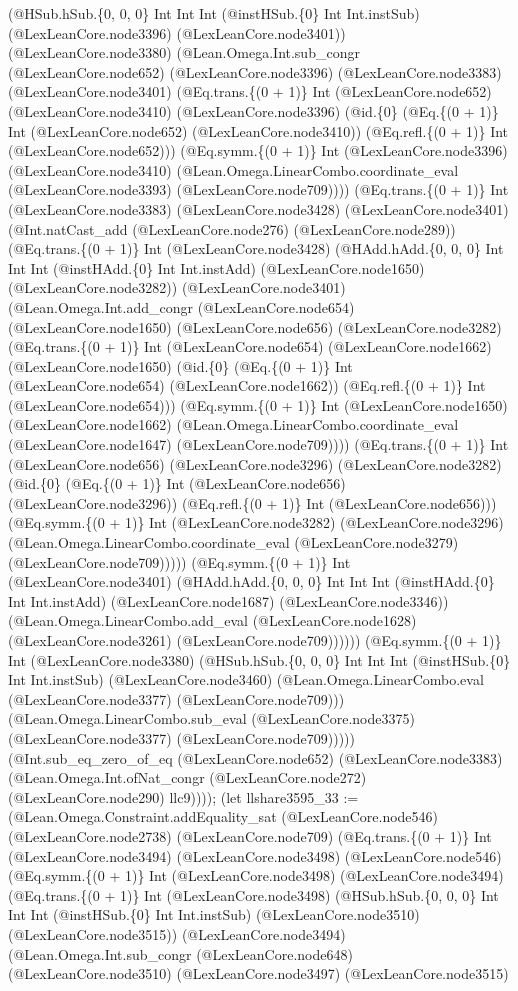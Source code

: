 \documentclass[11pt]{article}
\begin{document}
(@HSub.hSub.\{0, 0, 0\} Int Int Int (@instHSub.\{0\} Int Int.instSub) (@LexLeanCore.node3396) (@LexLeanCore.node3401)) (@LexLeanCore.node3380) (@Lean.Omega.Int.sub\_congr (@LexLeanCore.node652) (@LexLeanCore.node3396) (@LexLeanCore.node3383) (@LexLeanCore.node3401) (@Eq.trans.\{(0 + 1)\} Int (@LexLeanCore.node652) (@LexLeanCore.node3410) (@LexLeanCore.node3396) (@id.\{0\} (@Eq.\{(0 + 1)\} Int (@LexLeanCore.node652) (@LexLeanCore.node3410)) (@Eq.refl.\{(0 + 1)\} Int (@LexLeanCore.node652))) (@Eq.symm.\{(0 + 1)\} Int (@LexLeanCore.node3396) (@LexLeanCore.node3410) (@Lean.Omega.LinearCombo.coordinate\_eval (@LexLeanCore.node3393) (@LexLeanCore.node709)))) (@Eq.trans.\{(0 + 1)\} Int (@LexLeanCore.node3383) (@LexLeanCore.node3428) (@LexLeanCore.node3401) (@Int.natCast\_add (@LexLeanCore.node276) (@LexLeanCore.node289)) (@Eq.trans.\{(0 + 1)\} Int (@LexLeanCore.node3428) (@HAdd.hAdd.\{0, 0, 0\} Int Int Int (@instHAdd.\{0\} Int Int.instAdd) (@LexLeanCore.node1650) (@LexLeanCore.node3282)) (@LexLeanCore.node3401) (@Lean.Omega.Int.add\_congr (@LexLeanCore.node654) (@LexLeanCore.node1650) (@LexLeanCore.node656) (@LexLeanCore.node3282) (@Eq.trans.\{(0 + 1)\} Int (@LexLeanCore.node654) (@LexLeanCore.node1662) (@LexLeanCore.node1650) (@id.\{0\} (@Eq.\{(0 + 1)\} Int (@LexLeanCore.node654) (@LexLeanCore.node1662)) (@Eq.refl.\{(0 + 1)\} Int (@LexLeanCore.node654))) (@Eq.symm.\{(0 + 1)\} Int (@LexLeanCore.node1650) (@LexLeanCore.node1662) (@Lean.Omega.LinearCombo.coordinate\_eval (@LexLeanCore.node1647) (@LexLeanCore.node709)))) (@Eq.trans.\{(0 + 1)\} Int (@LexLeanCore.node656) (@LexLeanCore.node3296) (@LexLeanCore.node3282) (@id.\{0\} (@Eq.\{(0 + 1)\} Int (@LexLeanCore.node656) (@LexLeanCore.node3296)) (@Eq.refl.\{(0 + 1)\} Int (@LexLeanCore.node656))) (@Eq.symm.\{(0 + 1)\} Int (@LexLeanCore.node3282) (@LexLeanCore.node3296) (@Lean.Omega.LinearCombo.coordinate\_eval (@LexLeanCore.node3279) (@LexLeanCore.node709))))) (@Eq.symm.\{(0 + 1)\} Int (@LexLeanCore.node3401) (@HAdd.hAdd.\{0, 0, 0\} Int Int Int (@instHAdd.\{0\} Int Int.instAdd) (@LexLeanCore.node1687) (@LexLeanCore.node3346)) (@Lean.Omega.LinearCombo.add\_eval (@LexLeanCore.node1628) (@LexLeanCore.node3261) (@LexLeanCore.node709)))))) (@Eq.symm.\{(0 + 1)\} Int (@LexLeanCore.node3380) (@HSub.hSub.\{0, 0, 0\} Int Int Int (@instHSub.\{0\} Int Int.instSub) (@LexLeanCore.node3460) (@Lean.Omega.LinearCombo.eval (@LexLeanCore.node3377) (@LexLeanCore.node709))) (@Lean.Omega.LinearCombo.sub\_eval (@LexLeanCore.node3375) (@LexLeanCore.node3377) (@LexLeanCore.node709))))) (@Int.sub\_eq\_zero\_of\_eq (@LexLeanCore.node652) (@LexLeanCore.node3383) (@Lean.Omega.Int.ofNat\_congr (@LexLeanCore.node272) (@LexLeanCore.node290) llc9)))); (let llshare3595\_33 := (@Lean.Omega.Constraint.addEquality\_sat (@LexLeanCore.node546) (@LexLeanCore.node2738) (@LexLeanCore.node709) (@Eq.trans.\{(0 + 1)\} Int (@LexLeanCore.node3494) (@LexLeanCore.node3498) (@LexLeanCore.node546) (@Eq.symm.\{(0 + 1)\} Int (@LexLeanCore.node3498) (@LexLeanCore.node3494) (@Eq.trans.\{(0 + 1)\} Int (@LexLeanCore.node3498) (@HSub.hSub.\{0, 0, 0\} Int Int Int (@instHSub.\{0\} Int Int.instSub) (@LexLeanCore.node3510) (@LexLeanCore.node3515)) (@LexLeanCore.node3494) (@Lean.Omega.Int.sub\_congr (@LexLeanCore.node648) (@LexLeanCore.node3510) (@LexLeanCore.node3497) (@LexLeanCore.node3515) 
\end{document}
